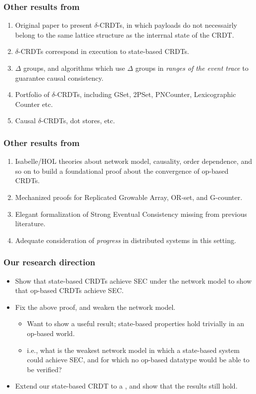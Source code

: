 \documentclass[aspectratio=169,compress]{beamer}
\newcommand{\dcrdt}{\text{$\delta$-CRDT}}
\begin{document}
  \begin{frame}
    \frametitle{Other results from~\cite{almeida16}}
    \begin{enumerate}
      \item Original paper to present $\delta$-CRDTs, in which payloads do not
        necessairly belong to the same lattice structure as the interrnal state
        of the CRDT.
      \item $\delta$-CRDTs correspond in execution to state-based CRDTs.
      \item $\Delta$ groups, and algorithms which use $\Delta$ groups in
        \textit{ranges of the event trace} to guarantee causal consistency.
      \item Portfolio of $\delta$-CRDTs, including GSet, 2PSet, PNCounter,
        Lexicographic Counter etc.
      \item Causal $\delta$-CRDTs, dot stores, etc.
    \end{enumerate}
  \end{frame}

  \begin{frame}
    \frametitle{Other results from~\cite{gomes17}}
    \begin{enumerate}
      \item Isabelle/HOL theories about network model, causality, order
        dependence, and so on to build a foundational proof about the
        convergence of op-based CRDTs.
      \item Mechanized proofs for Replicated Growable Array, OR-set, and
        G-counter.
      \item Elegant formalization of Strong Eventual Consistency missing from
        previous literature.
      \item Adequate consideration of \textit{progress} in distributed systems
        in this setting.
    \end{enumerate}
  \end{frame}

  \begin{frame}
    \frametitle{Our research direction}

    \begin{itemize}[<+->]
      \item Show that state-based CRDTs achieve SEC under the network model to
        show that op-based CRDTs achieve SEC.
      \item Fix the above proof, and weaken the network model.
        \begin{itemize}
          \item Want to show a useful result; state-based properties hold
            trivially in an op-based world.
          \item i.e., what is the weakest network model in which a state-based
            system could achieve SEC, and for which no op-based datatype would
            be able to be verified?
        \end{itemize}
      \item Extend our state-based CRDT to a \dcrdt, and show that the results
        still hold.
    \end{itemize}
  \end{frame}
\end{document}
